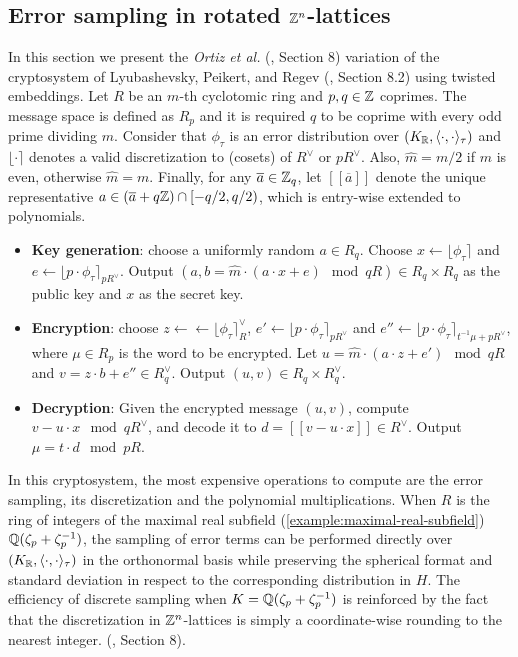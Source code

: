 \documentclass[a4paper,12pt]{article}
\begin{document}
\subsection{Error sampling in rotated \(\mathbb{Z}^n\)-lattices}
\label{sampling-in-zn-rotated-lattices}
\begin{text}
  In this section we present the \textit{Ortiz et al.} (\cite{Ortiz2021}, Section 8)
  variation of the cryptosystem of Lyubashevsky, Peikert, and Regev
  (\cite{LPV2013}, Section 8.2) using twisted embeddings. Let $R$ be an $m$-th
  cyclotomic ring and $p, q \in \mathbb{Z}$ coprimes. The message space is defined as
  $R_p$ and it is required $q$ to be coprime with every odd prime dividing
  $m$. Consider that $\phi_\tau$ is an error distribution over $(K_{\mathbb{R}},\langle{\cdot,\cdot}\rangle_\tau)$
  and $\lfloor{\cdot}\rceil$ denotes a valid discretization to (cosets) of $R^\vee$ or $pR^\vee$.
  Also, $\hat{m} = m/2$ if $m$ is even, otherwise $\hat{m} = m$. Finally, for any
  $\overline{a} \in \mathbb{Z}_q$, let $[[\overline{a}]]$ denote the unique representative
  $a \in (\overline{a} + q\mathbb{Z}) \cap [-q/2, q/2)$, which is entry-wise extended to
  polynomials.

  \begin{itemize}
  \item \textbf{Key generation}: choose a uniformly random $a \in R_q$. Choose $x
    \longleftarrow \lfloor{\phi_\tau}\rceil$ and $e \longleftarrow \lfloor{p \cdot \phi_\tau}\rceil_{pR^\vee}$. Output $(a,b = \hat{m}\cdot(a \cdot x + e)
    \mod{qR} ) \in R_q \times R_q$ as the public key and $x$ as the secret key.
  \item \textbf{Encryption}: choose $z \longleftarrow \longleftarrow \lfloor{\phi_\tau}\rceil_R^\vee$, $e' \longleftarrow \lfloor{p \cdot
      \phi_\tau}\rceil_{pR^\vee}$ and  $e'' \longleftarrow \lfloor{p \cdot \phi_\tau}\rceil_{t^{-1}\mu +pR^\vee}$, where $\mu \in R_p$ is
    the word to be encrypted. Let $u = \hat{m} \cdot (a \cdot z + e') \mod{qR}$ and $v =
    z \cdot b + e'' \in R_q^\vee$. Output $(u,v) \in R_q \times R^\vee_q$.
  \item \textbf{Decryption}: Given the encrypted message $(u,v)$, compute $v - u
    \cdot x \mod{qR^\vee}$, and decode it to $d = [[v - u \cdot x]] \in R^\vee$. Output $\mu = t \cdot
    d \mod{pR}$. 
  \end{itemize}

  In this cryptosystem, the most expensive operations to compute are the error sampling, its discretization and the polynomial multiplications. When $R$ is
  the ring of integers of the maximal real subfield
  (\ref{example:maximal-real-subfield}) $\mathbb{Q}(\zeta_{p} + \zeta_{p} ^{-1})$, the sampling of error terms can be performed directly over $(K_{\mathbb{R}}, \langle{\cdot,\cdot}\rangle_\tau)$ in the orthonormal basis while preserving the spherical format and standard deviation in respect to the corresponding distribution in $H$. The efficiency
of discrete sampling when $K = \mathbb{Q}(\zeta_p + \zeta_p^{-1})$ is reinforced by the fact
that the discretization in $\mathbb{Z}^n$-lattices is simply a coordinate-wise rounding to the nearest integer. (\cite{Ortiz2021}, Section 8).
\end{text}
\end{document}
